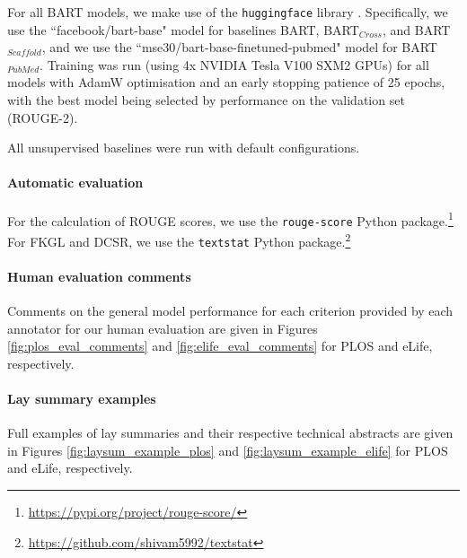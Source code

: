 \documentclass[11pt]{article}
\begin{document}
For all \textsc{BART} models, we make use of the \texttt{huggingface} library \citep{huggingface}. Specifically, we use the ``facebook/bart-base" model for baselines \textsc{BART}, \textsc{BART$_{Cross}$}, and \textsc{BART$_{Scaffold}$}, and we use the ``mse30/bart-base-finetuned-pubmed" model for \textsc{BART$_{PubMed}$}. Training was run (using 4x NVIDIA Tesla V100 SXM2 GPUs) for all models with AdamW optimisation \citep{Loshchilov2019DecoupledWD} and an early stopping patience of 25 epochs, with the best model being selected by performance on the validation set (ROUGE-2). 


All unsupervised baselines were run with default configurations.

\paragraph{Automatic evaluation}
For the calculation of ROUGE scores, we use the \texttt{rouge-score} Python package.\footnote{\url{https://pypi.org/project/rouge-score/}} For FKGL and DCSR, we use the \texttt{textstat} Python package.\footnote{\url{https://github.com/shivam5992/textstat}} 

\paragraph{Human evaluation comments}
Comments on the general model performance for each criterion provided by each annotator for our human evaluation are given in Figures \ref{fig:plos_eval_comments} and  \ref{fig:elife_eval_comments} for PLOS and eLife, respectively. 

\paragraph{Lay summary examples}
Full examples of lay summaries and their respective technical abstracts are given in Figures \ref{fig:laysum_example_plos} and \ref{fig:laysum_example_elife} for PLOS and eLife, respectively.
\end{document}
